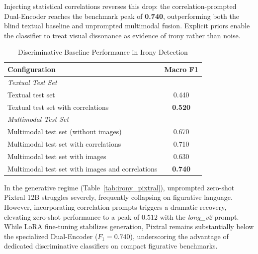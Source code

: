 Injecting statistical correlations reverses this drop: the correlation-prompted Dual-Encoder reaches the benchmark peak of \textbf{0.740}, outperforming both the blind textual baseline and unprompted multimodal fusion. Explicit priors enable the classifier to treat visual dissonance as evidence of irony rather than noise.

\begin{table}[!t]
\centering
\caption{Discriminative Baseline Performance in Irony Detection}
\label{tab:irony_baselines}
\small
\renewcommand{\arraystretch}{1.05}
\begin{tabular}{l c}
\hline
\textbf{Configuration} & \textbf{Macro F1} \\
\hline
\multicolumn{2}{l}{\textit{Textual Test Set}} \\
Textual test set & 0.440 \\
Textual test set with correlations & \textbf{0.520} \\
\hline
\multicolumn{2}{l}{\textit{Multimodal Test Set}} \\
Multimodal test set (without images) & 0.670 \\
Multimodal test set with correlations & 0.710 \\
Multimodal test set with images & 0.630 \\
Multimodal test set with images and correlations & \textbf{0.740} \\
\hline
\end{tabular}
\end{table}

In the generative regime (Table~\ref{tab:irony_pixtral}), unprompted zero-shot Pixtral 12B struggles severely, frequently collapsing on figurative language. However, incorporating correlation prompts triggers a dramatic recovery, elevating zero-shot performance to a peak of $0.512$ with the \textit{long\_v2} prompt. While LoRA fine-tuning stabilizes generation, Pixtral remains substantially below the specialized Dual-Encoder ($F_1 = 0.740$), underscoring the advantage of dedicated discriminative classifiers on compact figurative benchmarks.

